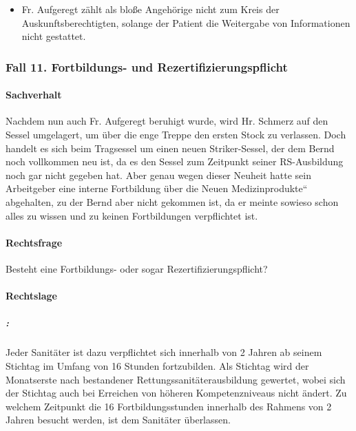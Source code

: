 \begin{itemize}
	\item {\mdseries\color[rgb]{0.0,0.0,0.5019608}
	Fr. Aufgeregt zählt als blo{\ss}e Angeh\"orige nicht zum Kreis der
	Auskunftsberechtigten, solange der Patient die Weitergabe von
	Informationen nicht gestattet. }

\end{itemize}

\subsubsection{Fall 11. Fortbildungs- und Rezertifizierungspflicht}

\paragraph*{Sachverhalt}

{\mdseries
Nachdem nun auch Fr. Aufgeregt beruhigt wurde, wird Hr. Schmerz auf den
Sessel umgelagert, um \"uber die enge Treppe den ersten Stock zu
verlassen. Doch handelt es sich beim Tragsessel um einen neuen
Striker-Sessel, der dem Bernd noch vollkommen neu ist, da es den Sessel
zum Zeitpunkt seiner RS-Ausbildung noch gar nicht gegeben hat. Aber
genau wegen dieser Neuheit hatte sein Arbeitgeber eine interne
Fortbildung \"uber die {\quotedblbase}Neuen
Medizinprodukte{\textquotedblleft} abgehalten, zu der Bernd aber nicht
gekommen ist, da er meinte sowieso schon alles zu wissen und zu keinen
Fortbildungen verpflichtet ist.}

\paragraph*{Rechtsfrage}

Besteht eine Fortbildungs- oder sogar Re\-zertifizierungs\-pflicht?

\paragraph*{Rechtslage}

\subparagraph*{  :}

Jeder Sanitäter ist dazu verpflichtet sich innerhalb von 2 Jahren ab
seinem Stichtag im Umfang von 16 Stunden fortzubilden. Als Stichtag
wird der Monatserste nach bestandener Rettungssanitäterausbildung
gewertet, wobei sich der Stichtag auch bei Erreichen von h\"oheren
Kompetenzniveaus nicht ändert. Zu welchem Zeitpunkt die 16
Fortbildungsstunden innerhalb des Rahmens von 2 Jahren besucht werden,
ist dem Sanitäter \"uberlassen. 

